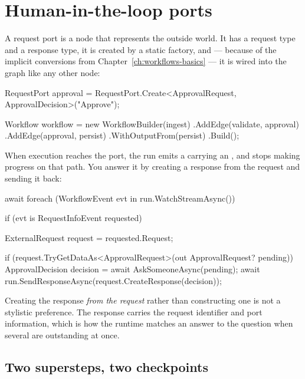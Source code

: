 \section{Human-in-the-loop ports}
\label{sec:dur-hitl}

A request port is a node that represents the outside world. It has a request type
and a response type, it is created by a static factory, and --- because of the
implicit conversions from Chapter~\ref{ch:workflows-basics} --- it is wired into
the graph like any other node:

\begin{csharp}[caption={A port is a node}, label={lst:dur-port}]
RequestPort approval = RequestPort.Create<ApprovalRequest, ApprovalDecision>("Approve");

Workflow workflow = new WorkflowBuilder(ingest)
    .AddEdge(validate, approval)
    .AddEdge(approval, persist)
    .WithOutputFrom(persist)
    .Build();
\end{csharp}

When execution reaches the port, the run emits a  carrying
an , and stops making progress on that path. You answer it
by creating a response from the request and sending it back:

\begin{csharp}[caption={Answering a request}, label={lst:dur-respond}]
await foreach (WorkflowEvent evt in run.WatchStreamAsync())
{
    if (evt is RequestInfoEvent requested)
    {
        ExternalRequest request = requested.Request;

        if (request.TryGetDataAs<ApprovalRequest>(out ApprovalRequest? pending))
        {
            ApprovalDecision decision = await AskSomeoneAsync(pending);
            await run.SendResponseAsync(request.CreateResponse(decision));
        }
    }
}
\end{csharp}

Creating the response \emph{from the request} rather than constructing one is not
a stylistic preference. The response carries the request identifier and port
information, which is how the runtime matches an answer to the question when
several are outstanding at once.

\subsection{Two supersteps, two checkpoints}

